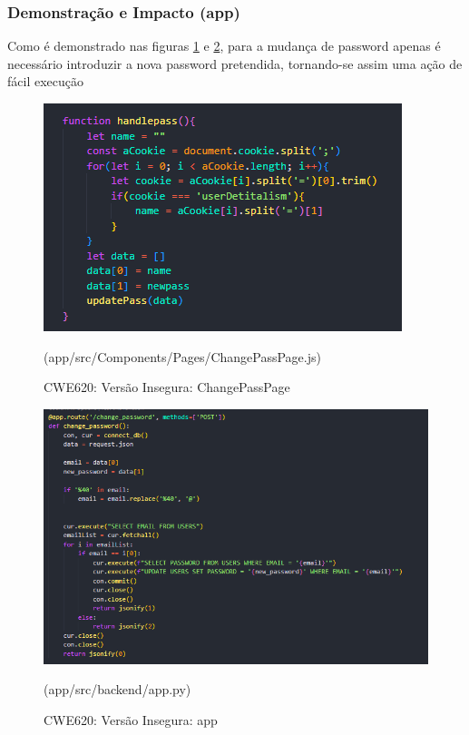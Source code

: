 \subsubsection{Demonstração e Impacto (app)}
Como é demonstrado nas figuras \ref{fig:cwe620-unsafe-changepasspage} e \ref{fig:cwe620-unsafe-app}, para a mudança de password apenas é necessário introduzir a nova password pretendida, tornando-se assim uma ação de fácil execução
\begin{figure}[H]
   \centering
    \includegraphics[width=0.7\linewidth]{images/CWE620-unsafe-ChangePassPage.png}
    \caption{CWE620: Versão Insegura: ChangePassPage }(app/src/Components/Pages/ChangePassPage.js)%
    \label{fig:cwe620-unsafe-changepasspage}
\end{figure}
\begin{figure}[H]
  \centering
    \includegraphics[width=0.7\linewidth]{images/CWE620-unsafe-app.png}
    \caption{CWE620: Versão Insegura: app  }(app/src/backend/app.py)%
    \label{fig:cwe620-unsafe-app}
\end{figure}


